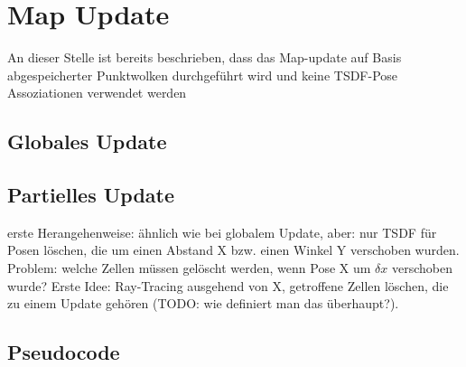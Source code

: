 \chapter{Map Update}
\label{chapter:map_update}

An dieser Stelle ist bereits beschrieben, dass das Map-update auf Basis abgespeicherter Punktwolken durchgeführt wird und keine TSDF-Pose Assoziationen verwendet werden

\section{Globales Update}

\section{Partielles Update}

erste Herangehenweise: ähnlich wie bei globalem Update, aber: nur TSDF für Posen löschen, die um einen Abstand X bzw. einen Winkel Y verschoben wurden. Problem: welche Zellen müssen gelöscht werden, wenn Pose X um $\delta x$ verschoben wurde? Erste Idee: Ray-Tracing ausgehend von X, getroffene Zellen löschen, die zu einem Update gehören (TODO: wie definiert man das überhaupt?).

\section{Pseudocode}
